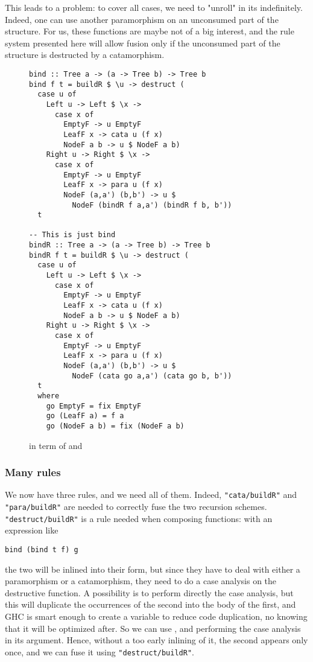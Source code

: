 This leads to a problem: to cover all cases, we need to "unroll"  in its  indefinitely. Indeed, one can use another paramorphism on an unconsumed part of the structure. For us, these functions are maybe not of a big interest, and the rule system presented here will allow fusion only if the unconsumed part of the structure is destructed by a catamorphism.

\begin{figure}
\begin{verbatim}
bind :: Tree a -> (a -> Tree b) -> Tree b
bind f t = buildR $ \u -> destruct (
  case u of
    Left u -> Left $ \x -> 
      case x of
        EmptyF -> u EmptyF
        LeafF x -> cata u (f x)
        NodeF a b -> u $ NodeF a b)
    Right u -> Right $ \x ->
      case x of
        EmptyF -> u EmptyF
        LeafF x -> para u (f x)
        NodeF (a,a') (b,b') -> u $
          NodeF (bindR f a,a') (bindR f b, b'))
  t

-- This is just bind
bindR :: Tree a -> (a -> Tree b) -> Tree b
bindR f t = buildR $ \u -> destruct (
  case u of
    Left u -> Left $ \x -> 
      case x of
        EmptyF -> u EmptyF
        LeafF x -> cata u (f x)
        NodeF a b -> u $ NodeF a b)
    Right u -> Right $ \x ->
      case x of
        EmptyF -> u EmptyF
        LeafF x -> para u (f x)
        NodeF (a,a') (b,b') -> u $
          NodeF (cata go a,a') (cata go b, b'))
  t
  where
    go EmptyF = fix EmptyF
    go (LeafF a) = f a
    go (NodeF a b) = fix (NodeF a b)

\end{verbatim}
\caption{ in term of  and }
\label{fig:bindbuild}
\end{figure}

\subsubsection{Many rules}
We now have three rules, and we need all of them. Indeed, \verb|"cata/buildR"| and \verb|"para/buildR"| are needed to correctly fuse the two recursion schemes. \verb|"destruct/buildR"| is a rule needed when composing functions: with an expression like
\begin{verbatim}
bind (bind t f) g
\end{verbatim}
\noindent the two  will be inlined into their  form, but since they have to deal with either a paramorphism or a catamorphism, they need to do a case analysis on the destructive function. A possibility is to perform directly the case analysis, but this will duplicate the occurrences of the second  into the body of the first, and GHC is smart enough to create a variable to reduce code duplication, no knowing that it will be optimized after. So we can use , and performing the case analysis in its argument. Hence, without a too early inlining of it, the second  appears only once, and we can fuse it using \verb|"destruct/buildR"|.

